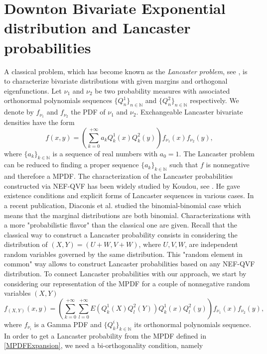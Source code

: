 \section{Downton Bivariate Exponential distribution and Lancaster probabilities}
A classical problem, which has become known as the \textit{Lancaster problem}, see \cite{Lan58}, is to characterize bivariate distributions with given margins and orthogonal eigenfunctions. Let $\nu_{1}$ and $\nu_{2}$ be two probability measures with associated orthonormal polynomials sequences $\{Q_{n}^{1}\}_{n\in\mathbb{N}}$ and $\{Q_{n}^{2}\}_{n\in\mathbb{N}}$ respectively. We denote by $f_{\nu_{1}}$ and $f_{\nu_{2}}$ the PDF of $\nu_{1}$ and $\nu_{2}$. Exchangeable Lancaster bivariate densities have the form
\begin{equation}\label{BivariateLancasterDensities}
f(x,y)=\left(\sum_{k=0}^{+\infty}a_{k}Q_{k}^{1}(x)Q_{k}^{2}(y)\right)f_{\nu_{1}}(x)f_{\nu_{2}}(y),
\end{equation}
where $\{a_{k}\}_{k\in\mathbb{N}}$ is a sequence of real numbers with $a_{0}=1$. The Lancaster problem can be reduced to finding a proper sequence $\{a_{k}\}_{k\in\mathbb{N}}$ such that $f$ is nonnegative and therefore a MPDF. The characterization of the Lancaster probabilities constructed via NEF-QVF has been widely studied by Koudou, see \cite{Kou95,Kou96}. He gave existence conditions and explicit forms of Lancaster sequences in various cases. In a recent publication, Diaconis et al. \cite{DiaGri12} studied the binomial-binomial case which means that the marginal distributions are both binomial. Characterizations with a more "probabilistic flavor" than the classical one are given. Recall that the classical way to construct a Lancaster probability consists in considering the distribution of $(X,Y)=(U+W,V+W)$, where $U, V, W$, are independent random variables governed by the same distribution. This "random element in common" way allows to construct Lancaster probabilities based on any NEF-QVF distribution. To connect Lancaster probabilities with our approach, we start by considering our representation of the MPDF for a couple of nonnegative random variables $(X,Y)$
\begin{equation}\label{MPDFExpansion}
f_{(X,Y)}(x,y)=\left(\sum_{k=0}^{+\infty}\sum_{l=0}^{+\infty}E\left(Q_{k}^{1}(X)Q_{l}^{2}(Y)\right)Q_{k}^{1}(x)Q_{l}^{2}(y)\right)f_{\nu_{1}}(x)f_{\nu_{2}}(y),
\end{equation}         
where $f_{\nu_{i}}$ is a Gamma PDF and $\{Q_{k}^{i}\}_{k\in\mathbb{N}}$ its orthonormal polynomials sequence. In order to get a Lancaster probability from the MPDF defined in \eqref{MPDFExpansion}, we need a bi-orthogonality condition, namely
